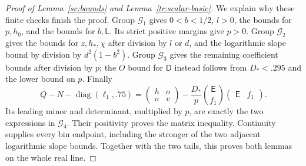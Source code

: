 \begin{proof}[Proof of Lemma~\ref{sc:bounds} and Lemma~\ref{tr:scalar-basic}]
We explain why these finite checks finish the proof. Group $\mathcal G_1$
gives $0<b<1/2$, $l>0$, the bounds for $p,h_0$, and the bounds for
$b,\mathsf L$. Its strict positive margins give $p>0$.
Group $\mathcal G_2$ gives the bounds for $z,h_*,\chi$ after division by
$l$ or $d$, and the logarithmic slope bound by division by
$d^2(1-b^2)$. Group $\mathcal G_3$ gives the remaining coefficient bounds
after division by $p$; the $O$ bound for $\mathsf D$ instead follows from
$D_*<.295$ and the lower bound on $p$.
Finally
\[
 Q-N-\operatorname{diag}(\ell_1,.75)
 =\begin{pmatrix}h&o\\o&v\end{pmatrix}
     -\frac{D_*}{p}\binom{\mathsf E}{f_1}
                             \begin{pmatrix}\mathsf E&f_1\end{pmatrix}.
\]
Its leading minor and determinant, multiplied by $p$, are exactly the
two expressions in $\mathcal G_4$. Their positivity proves the matrix
inequality. Continuity supplies every bin endpoint, including the stronger
of the two adjacent logarithmic slope bounds. Together with the two tails,
this proves both lemmas on the whole real line.
\end{proof}
